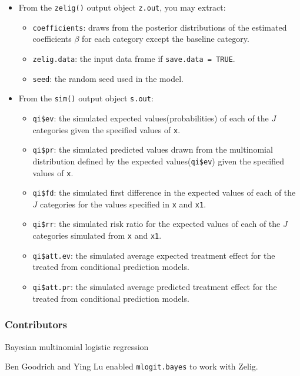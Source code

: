 \begin{itemize}
\item From the \texttt{zelig()} output object \texttt{z.out}, you may extract:

\begin{itemize}
\item \texttt{coefficients}: draws from the posterior distributions
of the estimated coefficients $\beta$ for each category except the baseline
category. 

   \item {\tt zelig.data}: the input data frame if {\tt save.data = TRUE}.  
\item \texttt{seed}: the random seed used in the model.

\end{itemize}

\item From the \texttt{sim()} output object \texttt{s.out}:

\begin{itemize}
\item \texttt{qi\$ev}: the simulated expected values(probabilities) of 
each of the $J$ categories given the specified values of \texttt{x}.

\item \texttt{qi\$pr}: the simulated predicted values drawn from the 
multinomial distribution defined by the expected values(\texttt{qi\$ev})
given the specified values of \texttt{x}.

\item \texttt{qi\$fd}: the simulated first difference in the expected
values of each of the $J$ categories for the values specified in 
\texttt{x} and \texttt{x1}.

\item \texttt{qi\$rr}: the simulated risk ratio for the 
expected values of each of the $J$ categories simulated 
from \texttt{x} and \texttt{x1}.

\item \texttt{qi\$att.ev}: the simulated average expected treatment effect
for the treated from conditional prediction models.

\item \texttt{qi\$att.pr}: the simulated average predicted treatment effect
for the treated from conditional prediction models.
\end{itemize}
\end{itemize}

\subsubsection{Contributors}
Bayesian multinomial logistic regression 

\noindent Ben Goodrich and Ying Lu enabled \texttt{mlogit.bayes} to work with Zelig.


